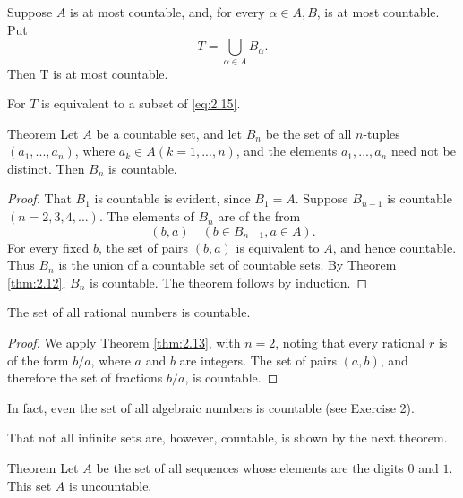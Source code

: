 \begin{myCorollary*}
    Suppose $A$ is at most countable, and, for every $\alpha \in A, B$, is at most countable. Put
    \begin{equation*}
        T = \bigcup_{\alpha\in A} B_\alpha.
    \end{equation*}
    Then T is at most countable.
\end{myCorollary*}

For $T$ is equivalent to a subset of \ref{eq:2.15}.

\begin{thm}
    \label{thm:2.13}
    Theorem Let $A$ be a countable set, and let $B_n$ be the set of all $n$-tuples $(a_1, ...,a_n)$, where $a_k \in  A (k=1,...,n)$, and the elements $a_1, ...,a_n$ need not be distinct. Then $B_n$ is countable.
\end{thm}

\begin{proof}
    That $B_1$ is countable is evident, since $B_1 = A$. 
    Suppose $B_{n-1}$ is countable $(n = 2, 3, 4, ... )$. 
    The elements of $B_n$ are of the from
    \begin{equation}
        \label{eq:2.18}
        (b,a)
        \quad
        (b \in B_{n-1},a \in A).
    \end{equation}
    For every fixed $b$, the set of pairs $(b, a)$ is equivalent to $A$, and hence countable. 
    Thus $B_n$ is the union of a countable set of countable sets. 
    By Theorem \ref{thm:2.12}, $B_n$ is countable.
    The theorem follows by induction.
\end{proof}

\begin{myCorollary*}
    The set of all rational numbers is countable.
\end{myCorollary*}

\begin{proof}
    We apply Theorem \ref{thm:2.13}, 
    with $n = 2$, noting that every rational $r$ is of the form $b / a$, 
    where $a$ and $b$ are integers. 
    The set of pairs $(a, b)$, 
    and therefore the set of fractions $b / a$, is countable.
\end{proof}

In fact, even the set of all algebraic numbers is countable (see Exercise 2).

That not all infinite sets are, however, countable, is shown by the next
theorem.

\begin{thm}
    \label{thm:2.14}
    Theorem Let $A$ be the set of all sequences whose elements are the digits $0$ and $1$. This set $A$ is uncountable. 
\end{thm}

